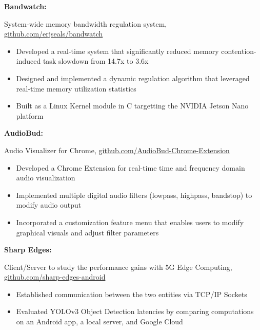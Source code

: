 \documentclass[letterpaper,10pt]{article}
\newcommand{\resumeItem}[2]{
  \item\normalsize{
    {#1}{#2 \vspace{-2pt}}
  }
}
\newcommand{\resumeSubItem}[2]{\resumeItem{#1}{#2}\vspace{-4pt}}
\begin{document}
{      \resumeSubItem{\textbf{Bandwatch: }}
      {System-wide memory bandwidth regulation system, \href{https://github.com/erjseals/bandwatch}{github.com/erjseals/bandwatch}
         \vspace{-4pt}
         \begin{itemize}
          \item Developed a real-time system that significantly reduced memory contention-induced task slowdown from 14.7x to 3.6x
          \vspace{-1pt}
          \item Designed and implemented a dynamic regulation algorithm that leveraged real-time memory utilization statistics
          \vspace{-1pt}
          \item Built as a Linux Kernel module in C targetting the NVIDIA Jetson Nano platform
         \end{itemize}
      }

     \vspace{4pt}

      \resumeSubItem{\textbf{AudioBud: }}
      {Audio Visualizer for Chrome, \href{https://github.com/eric-delacruz-prod/AudioBud-Chrome-Extension}{github.com/AudioBud-Chrome-Extension}
         \vspace{-4pt}
         \begin{itemize}
            \item Developed a Chrome Extension for real-time time and frequency domain audio visualization
            \vspace{-1pt}
            \item Implemented multiple digital audio filters (lowpass, highpass, bandstop) to modify audio output
            \vspace{-1pt}
            \item Incorporated a customization feature menu that enables users to modify graphical visuals and adjust filter parameters
         \end{itemize}
      }

      \vspace{4pt}

      \resumeSubItem{\textbf{Sharp Edges: }}
      {Client/Server to study the performance gains with 5G Edge Computing, \href{https://github.com/erjseals/sharp-edges-android}{github.com/sharp-edges-android}
         \vspace{-4pt}
         \begin{itemize}
          \item Established communication between the two entities via TCP/IP Sockets 
          \vspace{-1pt}
          \item Evaluated YOLOv3 Object Detection latencies by comparing computations on an Android app, a local server, and Google Cloud
         \end{itemize}
      }

}
\end{document}
